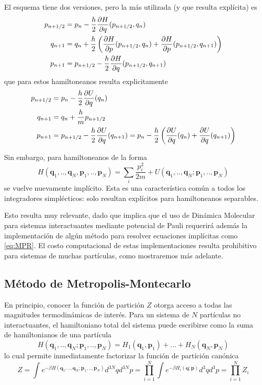 El esquema tiene dos versiones, pero la más utilizada (y que resulta explícita) es
\begin{align*}
 p_{n+1/2} &= p_n - \frac{h}{2}\frac{\partial H}{\partial q}(p_{n+1/2}, q_n) \\
 q_{n+1} &= q_n + \frac{h}{2}\left( \frac{\partial H}{\partial p}(p_{n+1/2}, q_n) + \frac{\partial H}{\partial p}(p_{n+1/2}, q_{n+1}) \right) \\
 p_{n+1} &= p_{n+1/2} - \frac{h}{2}\frac{\partial H}{\partial q}(p_{n+1/2}, q_{n+1})
\end{align*}
que para estos hamiltoneanos resulta explicitamente
\begin{align*}
 p_{n+1/2} &= p_n - \frac{h}{2}\frac{\partial U}{\partial q}(q_n) \\
 q_{n+1} &= q_n + \frac{h}{m}p_{n+1/2} \\
 p_{n+1} &= p_{n+1/2} - \frac{h}{2}\frac{\partial U}{\partial q}(q_{n+1}) = p_n - \frac{h}{2} \left( \frac{\partial U}{\partial q}(q_n) + \frac{\partial U}{\partial q}(q_{n+1}) \right)
\end{align*}

Sin embargo, para hamiltoneanos de la forma
\[ H(\mathbf{q}_1,..,\mathbf{q}_N,\mathbf{p}_1,..,\mathbf{p}_N) = \sum_i \frac{p_i^2}{2m} + U(\mathbf{q}_1,..,\mathbf{q}_N;\mathbf{p}_1,..,\mathbf{p}_N)\]
se vuelve nuevamente implícito. 
Esta es una característica común a todos los integradores simplécticos: solo resultan explícitos para hamiltoneanos separables.

Esto resulta muy relevante, dado que implica que el uso de Dinámica Molecular para sistemas interactuantes mediante potencial de Pauli requerirá además la implementación
de algún método para resolver ecuaciones implícitas como \eqref{eq:MPR}.
El costo computacional de estas implementaciones resulta prohibitivo para sistemas de muchas partículas, como mostraremos más adelante. 



\subsection{Método de Metropolis-Montecarlo}

En principio, conocer la función de partición $Z$ otorga acceso a todas las magnitudes termodinámicas de interés.
Para un sistema de $N$ partículas no interactuantes, el hamiltoniano total del sistema puede escribirse como la suma de hamiltonianos de una partícula
\[H(\mathbf{q}_1,..,\mathbf{q}_N;\mathbf{p}_1,..,\mathbf{p}_N) = H_1(\mathbf{q}_1, \mathbf{p}_1) + ... +H_N(\mathbf{q}_N, \mathbf{p}_N)\] 
lo cual permite inmediatamente factorizar la función de partición canónica
\[ Z = \int e^{-\beta H(\mathbf{q}_1,..,\mathbf{q}_N;\mathbf{p}_1,..,\mathbf{p}_N)} d^{3N}qd^{3N}p = \prod_{i=1}^N \int e^{-\beta H_i(\mathbf{q};\mathbf{p})} d^{3}qd^{3}p = \prod_{i=1}^N Z_i \]

